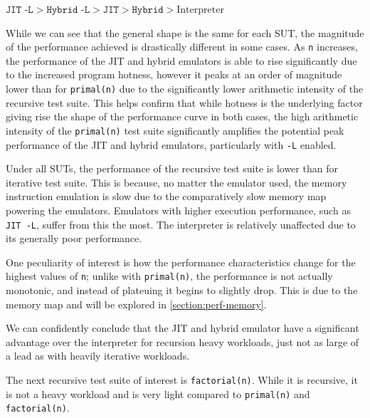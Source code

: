 $\texttt{JIT -L} > \texttt{Hybrid -L} > \texttt{JIT} > \texttt{Hybrid} > \text{Interpreter}$

While we can see that the general shape is the same for each SUT, the magnitude of the performance achieved is drastically different in some cases. As \texttt{n} increases, the performance of the JIT and hybrid emulators is able to rise significantly due to the increased program hotness, however it peaks at an order of magnitude lower than for \texttt{primal(n)} due to the significantly lower arithmetic intensity of the recursive test suite. This helps confirm that while hotness is the underlying factor giving rise the shape of the performance curve in both cases, the high arithmetic intensity of the \texttt{primal(n)} test suite significantly amplifies the potential peak performance of the JIT and hybrid emulators, particularly with \texttt{-L} enabled.

Under all SUTs, the performance of the recursive test suite is lower than for iterative test suite. This is because, no matter the emulator used, the memory instruction emulation is slow due to the comparatively slow memory map powering the emulators. Emulators with higher execution performance, such as \texttt{JIT -L}, suffer from this the most. The interpreter is relatively unaffected due to its generally poor performance.

One peculiarity of interest is how the performance characteristics change for the highest values of \texttt{n}; unlike with \texttt{primal(n)}, the performance is not actually monotonic, and instead of plateuing it begins to slightly drop. This is due to the memory map and will be explored in \autoref{section:perf-memory}.

We can confidently conclude that the JIT and hybrid emulator have a significant advantage over the interpreter for recursion heavy workloads, just not as large of a lead as with heavily iterative workloads.

The next recursive test suite of interest is \texttt{factorial(n)}. While it is recursive, it is not a heavy workload and is very light compared to \texttt{primal(n)} and \texttt{factorial(n)}.

